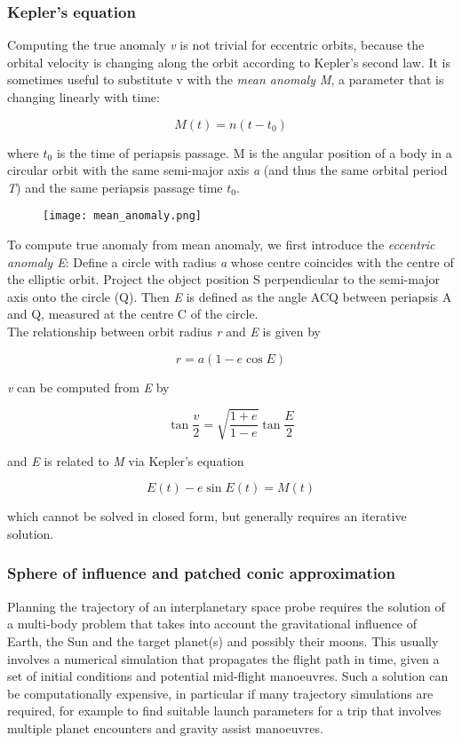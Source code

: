 \documentclass[Orbiter User Manual.tex]{subfiles}
\begin{document}
\subsubsection{Kepler’s equation}
Computing the true anomaly \textit{v} is not trivial for eccentric orbits, because the orbital velocity is changing along the orbit according to Kepler’s second law. It is sometimes useful to substitute v with the \textit{mean anomaly M}, a parameter that is changing linearly with time:

\[ M(t) = n(t - t_{0}) \]

\noindent
where $t_{0}$ is the time of periapsis passage. M is the angular position of a body in a circular orbit with the same semi-major axis \textit{a} (and thus the same orbital period \textit{T}) and the same periapsis passage time $t_{0}$.

\begin{figure}[H]
	\centering
	\texttt{[image: mean\_anomaly.png]}
\end{figure}

\noindent
To compute true anomaly from mean anomaly, we first introduce the \textit{eccentric anomaly E}: Define a circle with radius \textit{a} whose centre coincides with the centre of the elliptic orbit. Project the object position S perpendicular to the semi-major axis onto the circle (Q). Then \textit{E} is defined as the angle ACQ between periapsis A and Q, measured at the centre C of the circle.\\
The relationship between orbit radius \textit{r} and \textit{E} is given by

\[ r = a (1 - e \cos E) \]

\noindent
\textit{v} can be computed from \textit{E} by

\[ \tan \frac{v}{2} = \sqrt{\frac{1 + e}{1 - e}} \tan \frac{E}{2} \]

\noindent
and \textit{E} is related to \textit{M} via Kepler’s equation

\[ E(t) - e \sin E(t) = M(t) \]

\noindent
which cannot be solved in closed form, but generally requires an iterative solution.

\subsubsection{Sphere of influence and patched conic approximation}
Planning the trajectory of an interplanetary space probe requires the solution of a multi-body problem that takes into account the gravitational influence of Earth, the Sun and the target planet(s) and possibly their moons. This usually involves a numerical simulation that propagates the flight path in time, given a set of initial conditions and potential mid-flight manoeuvres. Such a solution can be computationally expensive, in particular if many trajectory simulations are required, for example to find suitable launch parameters for a trip that involves multiple planet encounters and gravity assist manoeuvres.
\end{document}
